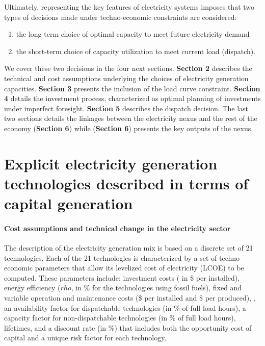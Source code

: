 Ultimately, representing the key features of electricity systems imposes that two types of decisions made under techno-economic constraints are considered:
\begin{enumerate}
    \item the long-term choice of optimal capacity to meet future electricity demand
    \item the short-term choice of capacity utilization to meet current load (dispatch).
\end{enumerate}

We cover these two decisions in the four next sections. \textbf{Section 2} describes the technical and cost assumptions underlying the choices of electricity generation capacities. \textbf{Section 3} presents the inclusion of the load curve constraint. \textbf{Section 4} details the investment process, characterized as optimal planning of investments under imperfect foresight. \textbf{Section 5} describes the dispatch decision. The last two sections details the linkages between the electricity nexus and the rest of the economy (\textbf{Section 6}) while (\textbf{Section 6}) presents the key outputs of the nexus.

\section{Explicit electricity generation technologies described in terms of capital generation}

\paragraph{ Cost assumptions and technical change in the electricity sector}

The description of the electricity generation mix is based on a discrete set of  21  technologies. Each of the  21  technologies is characterized by a set of techno-economic parameters that allow its levelized cost of electricity (LCOE) to be computed. These parameters include: investment costs ( in \$ per \kw  installed), energy efficiency ($rho$, in \% for the technologies using fossil fuels), fixed and variable operation and maintenance costs (\$ per \kw installed and \$ per \kwh produced), , an availability factor for dispatchable technologies (in \% of full load hours), a capacity factor for non-dispatchable technologies (in \% of full load hours), lifetimes, and a discount rate (in \%) that includes both the opportunity cost of capital and a unique risk factor for each technology.

